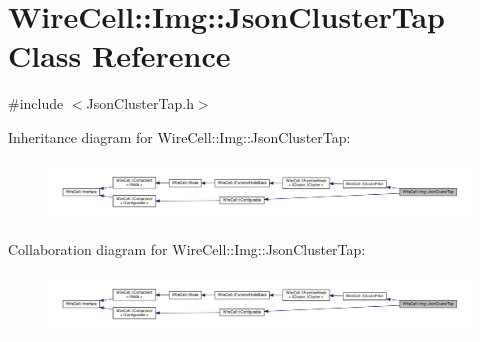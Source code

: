 \hypertarget{class_wire_cell_1_1_img_1_1_json_cluster_tap}{}\section{Wire\+Cell\+:\+:Img\+:\+:Json\+Cluster\+Tap Class Reference}
\label{class_wire_cell_1_1_img_1_1_json_cluster_tap}


{\ttfamily \#include $<$Json\+Cluster\+Tap.\+h$>$}



Inheritance diagram for Wire\+Cell\+:\+:Img\+:\+:Json\+Cluster\+Tap\+:
\nopagebreak
\begin{figure}[H]
\begin{center}
\leavevmode
\includegraphics[width=350pt]{class_wire_cell_1_1_img_1_1_json_cluster_tap__inherit__graph}
\end{center}
\end{figure}


Collaboration diagram for Wire\+Cell\+:\+:Img\+:\+:Json\+Cluster\+Tap\+:
\nopagebreak
\begin{figure}[H]
\begin{center}
\leavevmode
\includegraphics[width=350pt]{class_wire_cell_1_1_img_1_1_json_cluster_tap__coll__graph}
\end{center}
\end{figure}

